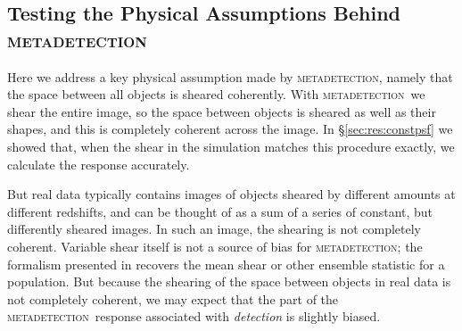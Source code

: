 \documentclass[iop, twocolappendix, appendixfloats, numberedappendix, apj]{hackemulateapj}
\newcommand{\mdet}{\textsc{metadetection}}
\begin{document}
\subsection{Testing the Physical Assumptions Behind \mdet}
\label{sec:mdetphys}

Here we address a key physical assumption made by \mdet, namely that the space
between all objects is sheared coherently.   With \mdet\ we shear the entire
image, so the space between objects is sheared as well as their shapes, and this
is completely coherent across the image.  In \S \ref{sec:res:constpsf} we
showed that, when the shear in the simulation matches this procedure exactly,
we calculate the response accurately.

But real data typically contains images of objects sheared by different amounts
at different redshifts, and can be thought of as a sum of a series of constant,
but differently sheared images.  In such an image, the shearing is not
completely coherent.  Variable shear itself is not a source of bias for \mdet;
the formalism presented in \citep{SheldonMcal2017} recovers the mean shear or
other ensemble statistic for a population.  But because the shearing of the
space between objects in real data is not completely coherent, we may expect
that the part of the \mdet\ response associated with {\em detection} is
slightly biased.

\end{document}
